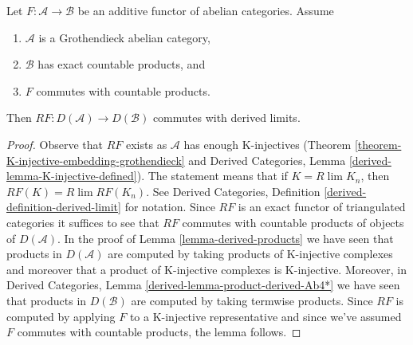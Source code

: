 \begin{lemma}
\label{lemma-RF-commutes-with-Rlim}
Let $F : \mathcal{A} \to \mathcal{B}$ be an additive functor of
abelian categories. Assume
\begin{enumerate}
\item $\mathcal{A}$ is a Grothendieck abelian category,
\item $\mathcal{B}$ has exact countable products, and
\item $F$ commutes with countable products.
\end{enumerate}
Then
$RF : D(\mathcal{A}) \to D(\mathcal{B})$ commutes with derived limits.
\end{lemma}

\begin{proof}
Observe that $RF$ exists as $\mathcal{A}$ has enough K-injectives
(Theorem \ref{theorem-K-injective-embedding-grothendieck}
and
Derived Categories, Lemma \ref{derived-lemma-K-injective-defined}).
The statement means that if $K = R\lim K_n$, then
$RF(K) = R\lim RF(K_n)$. See
Derived Categories, Definition \ref{derived-definition-derived-limit}
for notation. Since $RF$ is an exact functor of triangulated
categories it suffices to see that $RF$ commutes with countable
products of objects of $D(\mathcal{A})$. In the proof of
Lemma \ref{lemma-derived-products}
we have seen that products in $D(\mathcal{A})$ are computed by
taking products of K-injective complexes and moreover that a
product of K-injective complexes is K-injective.
Moreover, in Derived Categories, Lemma \ref{derived-lemma-product-derived-Ab4*}
we have seen that products in $D(\mathcal{B})$ are computed
by taking termwise products.
Since $RF$ is computed by applying $F$ to a K-injective
representative and since we've assumed $F$ commutes with
countable products, the lemma follows.
\end{proof}














